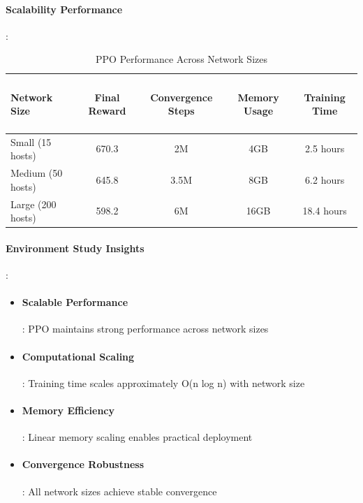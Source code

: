 \documentclass[12pt,oneside]{article}
\begin{document}
\paragraph{Scalability Performance}:
\begin{table}[H]
\centering
\caption{PPO Performance Across Network Sizes}
\begin{tabular}{|l|c|c|c|c|}
\hline
\paragraph{Network Size} & \paragraph{Final Reward} & \paragraph{Convergence Steps} & \paragraph{Memory Usage} & \paragraph{Training Time} \\
\hline
Small (15 hosts) & 670.3 & 2M & 4GB & 2.5 hours \\
Medium (50 hosts) & 645.8 & 3.5M & 8GB & 6.2 hours \\  
Large (200 hosts) & 598.2 & 6M & 16GB & 18.4 hours \\
\hline
\end{tabular}
\clearpage
\end{table}

\paragraph{Environment Study Insights}:
\begin{itemize}
\item \paragraph{Scalable Performance}: PPO maintains strong performance across network sizes
\item \paragraph{Computational Scaling}: Training time scales approximately O(n log n) with network size
\item \paragraph{Memory Efficiency}: Linear memory scaling enables practical deployment
\item \paragraph{Convergence Robustness}: All network sizes achieve stable convergence
\end{itemize}
\end{document}
